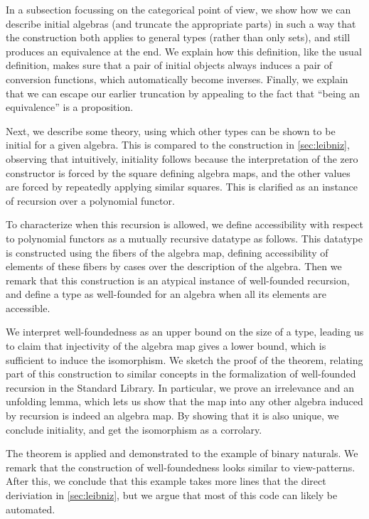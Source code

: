 \documentclass{article}
\theoremstyle{plain}%
\theoremstyle{definition}
\begin{document}
In a subsection focussing on the categorical point of view, we show how we can describe initial algebras (and truncate the appropriate parts) in such a way that the construction both applies to general types (rather than only sets), and still produces an equivalence at the end. We explain how this definition, like the usual definition, makes sure that a pair of initial objects always induces a pair of conversion functions, which automatically become inverses. Finally, we explain that we can escape our earlier truncation by appealing to the fact that ``being an equivalence'' is a proposition.

Next, we describe some theory, using which other types can be shown to be initial for a given algebra. This is compared to the construction in \autoref{sec:leibniz}, observing that intuitively, initiality follows because the interpretation of the zero constructor is forced by the square defining algebra maps, and the other values are forced by repeatedly applying similar squares. This is clarified as an instance of recursion over a polynomial functor.

To characterize when this recursion is allowed, we define accessibility with respect to polynomial functors as a mutually recursive datatype as follows. This datatype is constructed using the fibers of the algebra map, defining accessibility of elements of these fibers by cases over the description of the algebra. Then we remark that this construction is an atypical instance of well-founded recursion, and define a type as well-founded for an algebra when all its elements are accessible.

We interpret well-foundedness as an upper bound on the size of a type, leading us to claim that injectivity of the algebra map gives a lower bound, which is sufficient to induce the isomorphism. We sketch the proof of the theorem, relating part of this construction to similar concepts in the formalization of well-founded recursion in the Standard Library. In particular, we prove an irrelevance and an unfolding lemma, which lets us show that the map into any other algebra induced by recursion is indeed an algebra map. By showing that it is also unique, we conclude initiality, and get the isomorphism as a corrolary. 

The theorem is applied and demonstrated to the example of binary naturals. We remark that the construction of well-foundedness looks similar to view-patterns. After this, we conclude that this example takes more lines that the direct deriviation in \autoref{sec:leibniz}, but we argue that most of this code can likely be automated.
\end{document}
